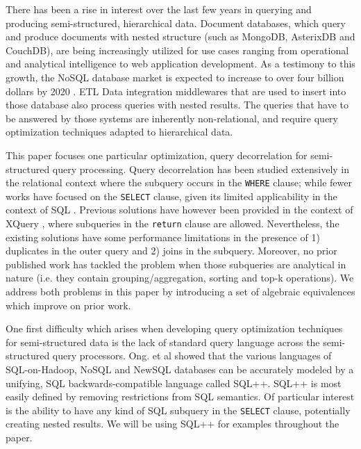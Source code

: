There has been a rise in interest over the last few years in querying and producing semi-structured, hierarchical data. Document databases, which query and produce documents with nested structure (such as MongoDB, AsterixDB and CouchDB), are being increasingly utilized for use cases ranging from operational and analytical intelligence to web application development. As a testimony to this growth, the NoSQL database market is expected to increase to over four billion dollars by 2020 \cite{asay:2015}. ETL Data integration middlewares that are used to insert into those database also process queries with nested results. The queries that have to be answered by those systems are inherently non-relational, and require query optimization techniques adapted to hierarchical data.

This paper focuses one particular optimization, query decorrelation for semi-structured query processing. Query decorrelation has been studied extensively in the relational context \cite{kim-tods-82, dayal-vldb-87, muralikrishna1989optimization, ganski-sigmod-87} where the subquery occurs in the \texttt{WHERE} clause; while fewer works have focused on the \texttt{SELECT} clause, given its limited applicability in the context of SQL \cite{galindo-legaria:2001aa}. Previous solutions have however been provided in the context of XQuery \cite{may:2003aa}, where subqueries in the \texttt{return} clause are allowed. Nevertheless, the existing solutions have some performance limitations in the presence of 1) duplicates in the outer query and 2) joins in the subquery. Moreover, no prior published work has tackled the problem when those subqueries are analytical in nature (i.e. they contain grouping/aggregation, sorting and top-k operations). We address both problems in this paper by introducing a set of algebraic equivalences which improve on prior work.

One first difficulty which arises when developing query optimization techniques for semi-structured data is the lack of standard query language across the semi-structured query processors. Ong. et al \cite{} showed that the various languages of SQL-on-Hadoop, NoSQL and NewSQL databases can be accurately modeled by a unifying, SQL backwards-compatible language called SQL++. SQL++ is most easily defined by removing restrictions from SQL semantics. Of particular interest is the ability to have any kind of SQL subquery in the \texttt{SELECT} clause, potentially creating nested results. We will be using SQL++ for examples throughout the paper. 


